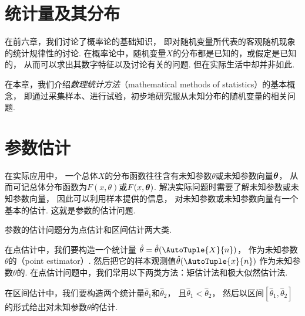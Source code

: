 


\chapter{统计量及其分布}
在前六章，我们讨论了概率论的基础知识，
即对随机变量所代表的客观随机现象的统计规律性的讨论.
在概率论中，随机变量\(X\)的分布都是已知的，或假定是已知的，
从而可以求出其数字特征以及讨论有关的问题.
但在实际生活中却并非如此.

在本章，我们介绍\emph{数理统计方法}（mathematical methods of statistics）的基本概念，
即通过采集样本、进行试验，初步地研究服从未知分布的随机变量的相关问题.







\chapter{参数估计}
在实际应用中，
一个总体\(X\)的分布函数往往含有未知参数\(\theta\)或未知参数向量\(\boldsymbol\theta\)，
从而可记总体分布函数为\(F(x,\theta)\)或\(F(x,\boldsymbol\theta)\).
解决实际问题时需要了解未知参数或未知参数向量，
因此可以利用样本提供的信息，
对未知参数或未知参数向量有一个基本的估计.
这就是参数的估计问题.

参数的估计问题分为点估计和区间估计两大类.

在点估计中，我们要构造一个统计量
\(\hat{\theta}=\hat{\theta}(\AutoTuple{X}{n})\)，
作为未知参数\(\theta\)的（point estimator）.
然后把它的样本观测值\(\hat{\theta}(\AutoTuple{x}{n})\)
作为未知参数\(\theta\)的.
在点估计问题中，我们常用以下两类方法：矩估计法和极大似然估计法.

在区间估计中，我们要构造两个统计量\(\hat{\theta}_1\)和\(\hat{\theta}_2\)，
且\(\hat{\theta}_1<\hat{\theta}_2\)，
然后以区间\([\hat{\theta}_1,\hat{\theta}_2]\)的形式给出对未知参数\(\theta\)的估计.










\endgroup
